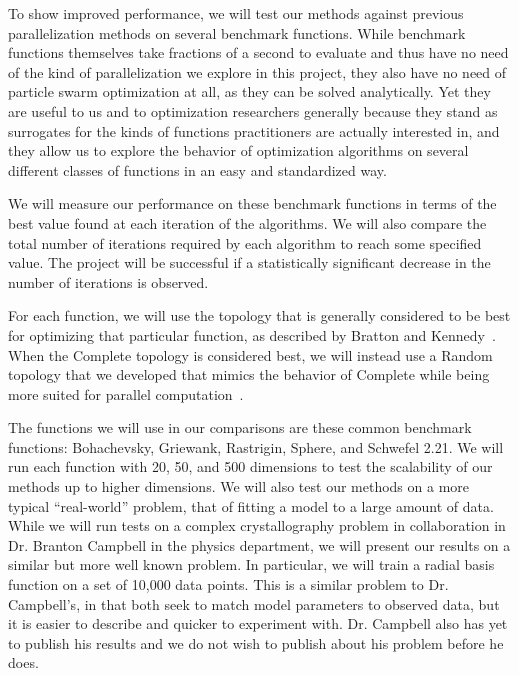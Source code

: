 \documentclass[ms]{byuprop}
\begin{document}
To show improved performance, we will test our methods against previous
parallelization methods on several benchmark functions.  While benchmark
functions themselves take fractions of a second to evaluate and thus have no
need of the kind of parallelization we explore in this project, they also have
no need of particle swarm optimization at all, as they can be solved
analytically.  Yet they are useful to us and to optimization researchers
generally because they stand as surrogates for the kinds of functions
practitioners are actually interested in, and they allow us to explore the
behavior of optimization algorithms on several different classes of functions
in an easy and standardized way.

We will measure our performance on these benchmark functions in terms of the
best value found at each iteration of the algorithms.  We will also compare the
total number of iterations required by each algorithm to reach some specified
value.  The project will be successful if a statistically significant decrease
in the number of iterations is observed.

For each function, we will use the topology that is generally considered to be
best for optimizing that particular function, as described by Bratton and
Kennedy~\cite{bratton-2007-defining-a-standard-for-pso}.  When the Complete
topology is considered best, we will instead use a Random topology that we
developed that mimics the behavior of Complete while being more suited for
parallel computation~\cite{mcnabb-2009-large-particle-swarms}.

The functions we will use in our comparisons are these common benchmark
functions: Bohachevsky, Griewank, Rastrigin, Sphere, and Schwefel 2.21.  We
will run each function with 20, 50, and 500 dimensions to test the scalability
of our methods up to higher dimensions.  We will also test our methods on a
more typical ``real-world'' problem, that of fitting a model to a large amount
of data.  While we will run tests on a complex crystallography problem in
collaboration in Dr. Branton Campbell in the physics department, we will
present our results on a similar but more well known problem.  In particular,
we will train a radial basis function on a set of 10,000 data points.  This is
a similar problem to Dr. Campbell's, in that both seek to match model
parameters to observed data, but it is easier to describe and quicker to
experiment with.  Dr. Campbell also has yet to publish his results and we do
not wish to publish about his problem before he does.
\end{document}

